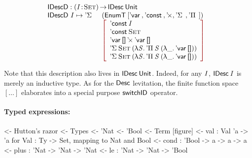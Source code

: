\[\stk{
\IDescD : \PI{\V{I}}{\Set} \IDesc{\Unit} \\
\begin{array}{@{}ll}
\IDescD~I \mapsto \DSigma{}{} & (\EnumT \red{[} \DVar{},
                                          \DConst{},
                                          \DProd{}{},
                                          \DSigma{}{}, 
                                          \DPi{}{} \red{]}) \\
                              & \bigRedBracket{\begin{array}{l}
                                      \DConst{\V{I}}                  \\
                                      \DConst{\Set}               \\
                                      \DProd{\DVar{\Void}}{\DVar{\Void}}  \\
                                      \DSigma{\Set}{(\LAM{\V{S}} \DPi{\V{S}}{(\LAM{\_} \DVar{\Void})})} \\
                                      \DSigma{\Set}{(\LAM{\V{S}} \DPi{\V{S}}{(\LAM{\_} \DVar{\Void})})}
                                   \end{array}
                             }
\end{array}
}\]

Note that this description also lives in $\IDesc{\Unit}$. Indeed,
for any $\V{I}$, $\IDesc{\V{I}}$ is merely an inductive type. As for the
$\Desc$ levitation, the finite function space $[ \ldots ]$ elaborates into a
special purpose $\F{switchID}$ operator. 

\paragraph{Typed expressions:}

\begin{wstructure}
<- Hutton's razor
    <- Types
        <- 'Nat
        <- 'Bool
    <- Term [figure]
        <- val : Val 'a -> 'a  for Val : Ty -> Set, mapping to Nat and Bool
        <- cond : 'Bool -> a -> a -> a
        <- plus : 'Nat -> 'Nat -> 'Nat
        <- le : 'Nat -> 'Nat -> 'Bool
\end{wstructure}

\newcommand{\Ty}{\C{Ty}}
\newcommand{\Ebool}{\etag{\CN{bool}}}
\newcommand{\Enat}{\etag{\CN{nat}}}

\newcommand{\Eval}[1]{\etag{\CN{val}}~#1}
\newcommand{\Econd}[3]{\etag{\CN{cond}}~#1~#2~#3}
\newcommand{\Eplus}[2]{\etag{\CN{plus}}~#1~#2}
\newcommand{\Ele}[2]{\etag{\CN{le}}~#1~#2}

